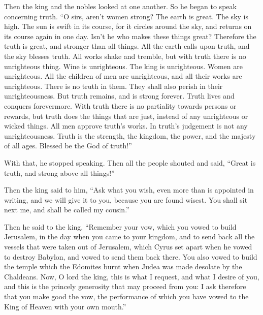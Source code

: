  Then the king and the nobles looked at one another. So he
began to speak concerning truth.  ``O sirs, aren't women
strong? The earth is great. The sky is high. The sun is swift in its
course, for it circles around the sky, and returns on its course again
in one day.  Isn't he who makes these things great?
Therefore the truth is great, and stronger than all things.
 All the earth calls upon truth, and the sky blesses truth.
All works shake and tremble, but with truth there is no unrighteous
thing.  Wine is unrighteous. The king is unrighteous. Women
are unrighteous. All the children of men are unrighteous, and all their
works are unrighteous. There is no truth in them. They shall also perish
in their unrighteousness.  But truth remains, and is strong
forever. Truth lives and conquers forevermore.  With truth
there is no partiality towards persons or rewards, but truth does the
things that are just, instead of any unrighteous or wicked things. All
men approve truth's works.  In truth's judgement is not any
unrighteousness. Truth is the strength, the kingdom, the power, and the
majesty of all ages. Blessed be the God of truth!''

 With that, he stopped speaking. Then all the people
shouted and said, ``Great is truth, and strong above all things!''

 Then the king said to him, ``Ask what you wish, even more
than is appointed in writing, and we will give it to you, because you
are found wisest. You shall sit next me, and shall be called my
cousin.''

 Then he said to the king, ``Remember your vow, which you
vowed to build Jerusalem, in the day when you came to your kingdom,
 and to send back all the vessels that were taken out of
Jerusalem, which Cyrus set apart when he vowed to destroy Babylon, and
vowed to send them back there.  You also vowed to build the
temple which the Edomites burnt when Judea was made desolate by the
Chaldeans.  Now, O lord the king, this is what I request,
and what I desire of you, and this is the princely generosity that may
proceed from you: I ask therefore that you make good the vow, the
performance of which you have vowed to the King of Heaven with your own
mouth.''

